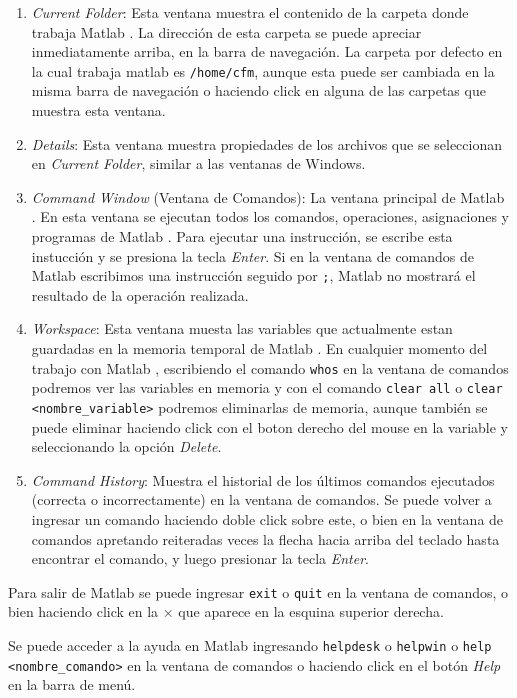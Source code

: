 \documentclass[letter,11pt]{article}
\newcommand\0{\mathbf{0}}
\newcommand{\matlab}{{\sc Matlab }}
\begin{document}
\begin{enumerate}
\item \emph{Current Folder}: Esta ventana muestra el contenido de la carpeta donde trabaja \matlab. La direcci\'on de esta carpeta se puede apreciar inmediatamente arriba, en la barra de navegaci\'on. La carpeta por defecto en la cual trabaja matlab es \verb"/home/cfm", aunque esta puede ser cambiada en la misma barra de navegaci\'on o haciendo click en alguna de las carpetas que muestra esta ventana.
\item \emph{Details}: Esta ventana muestra propiedades de los archivos que se seleccionan en \emph{Current Folder}, similar a las ventanas de Windows.
\item \emph{Command Window} (Ventana de Comandos):  La ventana principal de \matlab. En esta ventana se ejecutan todos los comandos, operaciones, asignaciones y programas de \matlab. Para ejecutar una instrucci\'on, se escribe esta instucci\'on y se presiona la tecla \emph{Enter}. Si en la ventana de comandos de \matlab{} escribimos una instrucci\'on seguido por \verb+;+, \matlab{}	no mostrar\'a el resultado de la operaci\'on realizada.		
\item \emph{Workspace}: Esta ventana muesta las variables que actualmente estan guardadas en la memoria temporal de \matlab. En cualquier momento del trabajo con \matlab, escribiendo el comando \Verb+whos+ en la ventana de comandos podremos ver	las variables en memoria y con el comando \Verb+clear all+ o \verb"clear <nombre_variable>" podremos eliminarlas de memoria, aunque tambi\'en se puede eliminar haciendo click con el boton derecho del mouse en la variable y seleccionando la opci\'on \emph{Delete}.
\item \emph{Command History}: Muestra el historial de los \'ultimos comandos ejecutados (correcta o incorrectamente) en la ventana de comandos. Se puede volver a ingresar un comando haciendo doble click sobre este, o bien en la ventana de comandos apretando reiteradas veces la flecha hacia arriba del teclado  hasta encontrar el comando, y luego presionar la tecla \emph{Enter}.
\end{enumerate}

Para salir de \matlab{} se puede ingresar \verb+exit+ o \verb+quit+ en la ventana de comandos, o bien haciendo click en la $\times$ que aparece en la esquina superior derecha.

Se puede acceder a la ayuda  en \matlab{} ingresando \verb+helpdesk+ o \verb+helpwin+ o \verb+help <nombre_comando>+ en la ventana de comandos o haciendo click en el bot\'on \emph{Help} en la barra de men\'u.
	
\end{document}
